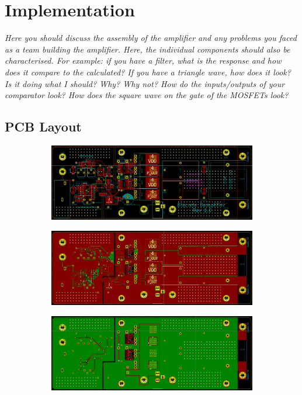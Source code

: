 \documentclass[11pt]{article}
\begin{document}
{\section{Implementation}

\textit{Here you should discuss the assembly of the amplifier and any problems you faced as a team building the amplifier.
Here, the individual components should also be characterised. For example: if you have a filter, what is the response and how does it compare to the calculated? If you have a triangle wave, how does it look? Is it doing what I should? Why? Why not? How do the inputs/outputs of your comparator look? How does the square wave on the gate of the MOSFETs look?}
 

\subsection{PCB Layout}

\begin{figure}
  \centering
  \begin{subfigure}{0.5\textwidth}
    \includegraphics[width=\columnwidth]{img/traces.png}
    \subcaption{}
  \end{subfigure}
  \begin{subfigure}{0.5\textwidth}
    \includegraphics[width=\columnwidth]{img/top_layer.png}
    \subcaption{}
  \end{subfigure}
  \begin{subfigure}{0.5\textwidth}
    \includegraphics[width=\columnwidth]{img/bottom_layer.png}
    \subcaption{}
  \end{subfigure}
  \caption{}
\end{figure}

}
\end{document}
